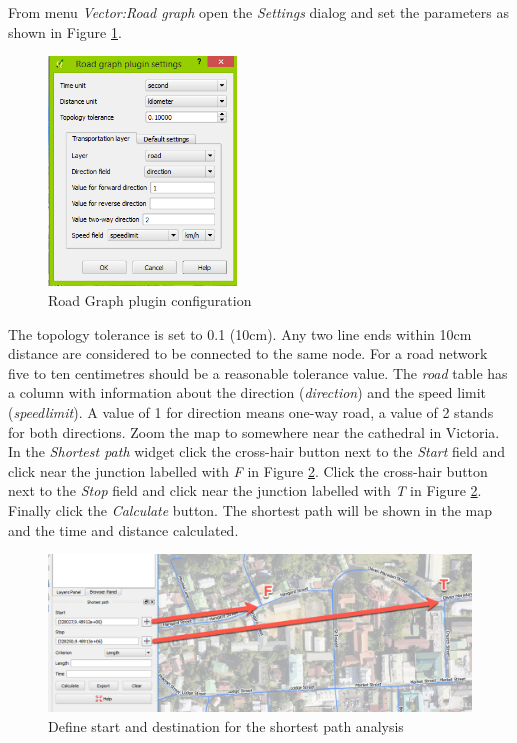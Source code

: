 \documentclass[a4paper,12pt,titlepage]{article}
\begin{document}
From menu \textit{Vector:Road graph} open the \textit{Settings} dialog and set the parameters as shown in Figure \ref{fig:road_graph_settings1}.

\begin{figure}[htb]
	\centering
	\includegraphics[width=5cm]{Images/road_graph_settings1.png}
	\caption{Road Graph plugin configuration}\label{fig:road_graph_settings1}
\end{figure}

The topology tolerance is set to 0.1 (10cm). Any two line ends within 10cm distance are considered to be connected to the same node. For a road network five to ten centimetres should be a reasonable tolerance value. The \textit{road} table has a column with information about the direction (\textit{direction}) and the speed limit (\textit{speedlimit}). A value of 1 for direction means one-way road, a value of 2 stands for both directions. Zoom the map to somewhere near the cathedral in Victoria. In the \textit{Shortest path} widget click the cross-hair button next to the \textit{Start} field and click near the junction labelled with \textit{F} in Figure \ref{fig:define_path}. Click the cross-hair button next to the \textit{Stop} field and click near the junction labelled with \textit{T} in Figure \ref{fig:define_path}. Finally click the \textit{Calculate} button. The shortest path will be shown in the map and the time and distance calculated.

\begin{figure}[htb]
	\centering
	\includegraphics[width=12cm]{Images/define_path.png}
	\caption{Define start and destination for the shortest path analysis}\label{fig:define_path}
\end{figure}
\end{document}
